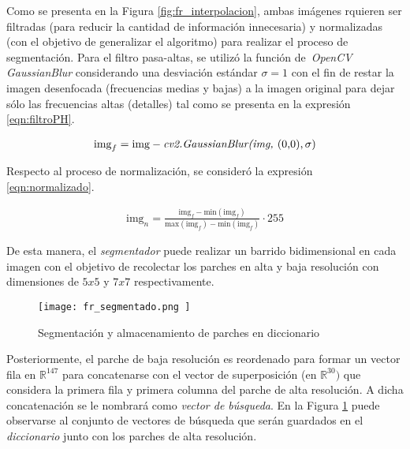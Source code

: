Como se presenta en la Figura \ref{fig:fr_interpolacion}, ambas imágenes 
rquieren ser filtradas (para reducir la cantidad de información innecesaria)
y normalizadas (con el objetivo de generalizar el algoritmo) para realizar el
proceso de segmentación. Para el filtro pasa-altas, se utilizó la función de\
\emph{OpenCV} \emph{GaussianBlur} considerando una desviación estándar $\sigma = 1$
con el fin de restar la imagen desenfocada (frecuencias medias y bajas) a la imagen 
original para dejar sólo las frecuencias altas (detalles) tal como se presenta
en la expresión \eqref{eqn:filtroPH}.

\begin{align}
    \label{eqn:filtroPH}
    \text{img}_f = \text{img} - \text{\emph{cv2.GaussianBlur(img, }(0,0),}\, \sigma)
\end{align}

Respecto al proceso de normalización, se consideró la expresión \eqref{eqn:normalizado}.

\begin{align}
    \label{eqn:normalizado}
    \text{img}_n = \frac{\text{img}_f-\text{min}(\text{img}_f)}{\text{max}(\text{img}_f)-\text{min}(\text{img}_f)}\cdot 255
\end{align}

De esta manera, el \emph{segmentador} puede realizar un barrido bidimensional en cada imagen 
con el objetivo de recolectar los parches en alta y baja resolución con 
dimensiones de $5x5$ y $7x7$ respectivamente.

\begin{figure}[H]
    \texttt{[image:  fr\_segmentado.png ]}
    \centering
    \caption{ Segmentación y almacenamiento de parches en diccionario }
    \label{fig:fr_segmentador}
\end{figure}

Posteriormente, el parche de baja resolución es reordenado para formar un 
vector fila en $\mathbb{R}^{147}$ para concatenarse con el vector de superposición
(en $\mathbb{R}^{30})$ que considera la primera fila y primera columna del
parche de alta resolución. A dicha concatenación se le nombrará como 
\emph{vector de búsqueda}. En la Figura \ref{fig:fr_segmentador} puede observarse
al conjunto de vectores de búsqueda que serán guardados en el \emph{diccionario}
junto con los parches de alta resolución. 